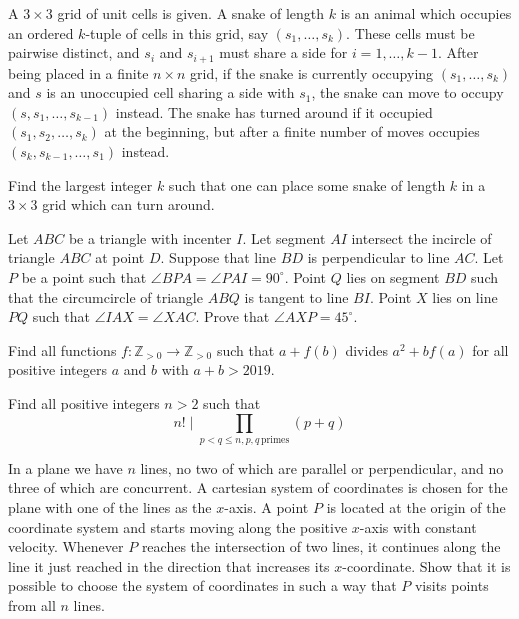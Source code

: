 \documentclass[11pt]{scrartcl}
\begin{document}
\begin{problem}[965885167255885]
A $3 \times 3$ grid of unit cells is given. A snake of length $k$ is an animal which occupies an ordered $k$-tuple of cells in this grid, say $(s_1, \dots, s_k)$. These cells must be pairwise distinct, and $s_i$ and $s_{i+1}$ must share a side for $i = 1, \dots, k-1$. After being placed in a finite $n \times n$ grid, if the snake is currently occupying $(s_1, \dots, s_k)$ and $s$ is an unoccupied cell sharing a side with $s_1$, the snake can move to occupy $(s, s_1, \dots, s_{k-1})$ instead. The snake has turned around if it occupied $(s_1, s_2, \dots, s_k)$ at the beginning, but after a finite number of moves occupies $(s_k, s_{k-1}, \dots, s_1)$ instead.

Find the largest integer $k$ such that one can place some snake of length $k$ in a $3 \times 3$ grid which can turn around.
\end{problem}
\begin{problem}[548248988934632]
Let $ABC$ be a triangle with incenter $I$. Let segment $AI$ intersect the incircle of triangle $ABC$ at point $D$. Suppose that line $BD$ is perpendicular to line $AC$. Let $P$ be a point such that $\angle BPA = \angle PAI = 90^\circ$. Point $Q$ lies on segment $BD$ such that the circumcircle of triangle $ABQ$ is tangent to line $BI$. Point $X$ lies on line $PQ$ such that $\angle IAX = \angle XAC$. Prove that $\angle AXP = 45^\circ$.
\end{problem}
\begin{problem}[3435532350205377704]
Find all functions $f:\mathbb Z_{>0}\to \mathbb Z_{>0}$ such that $a+f(b)$ divides $a^2+bf(a)$ for all positive integers $a$ and $b$ with $a+b>2019$.
\end{problem}
\begin{problem}[6919176010062551987]
Find all positive integers $n>2$ such that
$$ n! \mid \prod_{ p<q\le n, p,q \, \text{primes}} (p+q)$$
\end{problem}
\begin{problem}[6703839677147050695]
	In a plane we have $n$ lines, no two of which are parallel or perpendicular, and no three of which are concurrent. A cartesian system of coordinates is chosen for the plane with one of the lines as the $x$-axis. A point $P$ is located at the origin of the coordinate system and starts moving along the positive $x$-axis with constant velocity. Whenever $P$ reaches the intersection of two lines, it continues along the line it just reached in the direction that increases its $x$-coordinate. Show that it is possible to choose the system of coordinates in such a way that $P$ visits points from all $n$ lines.
\end{problem}
\end{document}
